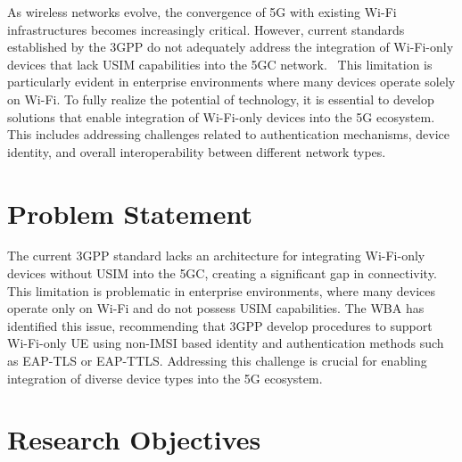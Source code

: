 
As wireless networks evolve, the convergence of 5G with existing Wi-Fi infrastructures becomes increasingly critical. However, current standards established by the \ac{3GPP} do not adequately address the integration of Wi-Fi-only devices that lack \ac{USIM} capabilities into the \ac{5GC} network.~\cite{wba-04-2021-p59} This limitation is particularly evident in enterprise environments where many devices operate solely on Wi-Fi. To fully realize the potential of  technology, it is essential to develop solutions that enable integration of Wi-Fi-only devices into the \ac{5G} ecosystem. This includes addressing challenges related to authentication mechanisms, device identity, and overall interoperability between different network types.

\section{Problem Statement}


The current \ac{3GPP} standard lacks an architecture for integrating Wi-Fi-only devices without \ac{USIM} into the \acl{5GC}, creating a significant gap in connectivity. This limitation is problematic in enterprise environments, where many devices operate only on Wi-Fi and do not possess \ac{USIM} capabilities. The \ac{WBA} has identified this issue, recommending that \ac{3GPP} develop procedures to support Wi-Fi-only \ac{UE} using non-\acs{IMSI} based identity and authentication methods such as \ac{EAP-TLS} or \ac{EAP-TTLS}. Addressing this challenge is crucial for enabling integration of diverse device types into the \ac{5G} ecosystem.

\section{Research Objectives}

